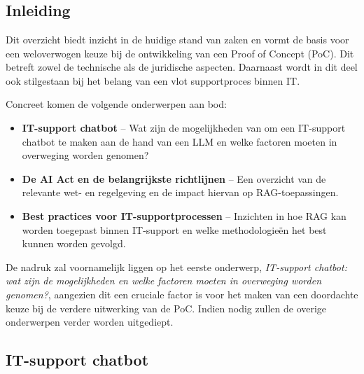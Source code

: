 \chapter{}%
\label{ch:stand-van-zaken}



\section{Inleiding}
Dit overzicht biedt inzicht in de huidige stand van zaken en vormt de basis voor een weloverwogen keuze bij de ontwikkeling van een Proof of Concept (PoC). Dit betreft zowel de technische als de juridische aspecten. Daarnaast wordt in dit deel ook stilgestaan bij het belang van een vlot supportproces binnen IT.

Concreet komen de volgende onderwerpen aan bod:
\begin{itemize}
    \item \textbf{IT-support chatbot} – Wat zijn de mogelijkheden van om een IT-support chatbot te maken aan de hand van een LLM en welke factoren moeten in overweging worden genomen?
    \item \textbf{De AI Act en de belangrijkste richtlijnen} – Een overzicht van de relevante wet- en regelgeving en de impact hiervan op RAG-toepassingen.
    \item \textbf{Best practices voor IT-supportprocessen} – Inzichten in hoe RAG kan worden toegepast binnen IT-support en welke methodologieën het best kunnen worden gevolgd.
\end{itemize}

De nadruk zal voornamelijk liggen op het eerste onderwerp, \textit{IT-support chatbot: wat zijn de mogelijkheden en welke factoren moeten in overweging worden genomen?}, aangezien dit een cruciale factor is voor het maken van een doordachte keuze bij de verdere uitwerking van de PoC. Indien nodig zullen de overige onderwerpen verder worden uitgediept.

\section{IT-support chatbot}

